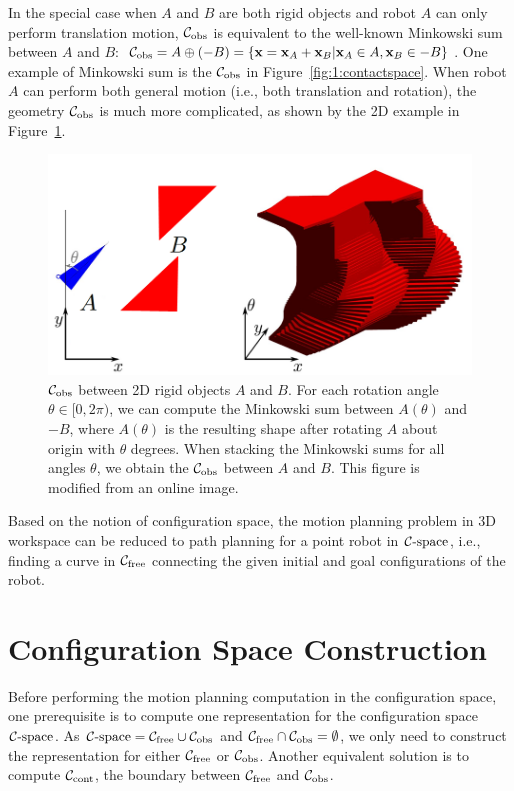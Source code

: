 In the special case when $A$ and $B$ are both rigid objects and robot $A$ can only perform translation motion, $\Cobs$ is equivalent to the well-known Minkowski sum between $A$ and $B$: $\mathcal C_{\text{obs}} = A \oplus (-B) = \{\mathbf x = \mathbf x_A + \mathbf x_B | \mathbf x_A \in A, \mathbf x_B \in -B \}$. One example of Minkowski sum is the $\Cobs$ in Figure~\ref{fig:1:contactspace}. When robot $A$ can perform both general motion (i.e., both translation and rotation), the geometry $\Cobs$ is much more complicated, as shown by the 2D example in Figure~\ref{fig:1:cspaceSE2}.

\begin{figure}[htb]
  \centering
  \includegraphics[width=0.9\linewidth]{figs/1/cspaceSE2.png}
  \caption[$\Cobs$ between 2D rigid objects $A$ and $B$]{$\Cobs$ between 2D rigid objects $A$ and $B$. For each rotation angle $\theta \in [0, 2\pi)$, we can compute the Minkowski sum between $A(\theta)$ and $-B$, where $A(\theta)$ is the resulting shape after rotating $A$ about origin with $\theta$ degrees. When stacking the Minkowski sums for all angles $\theta$, we obtain the $\Cobs$ between $A$ and $B$. This figure is modified from an online image.}
  \label{fig:1:cspaceSE2}
\end{figure}

Based on the notion of configuration space, the motion planning problem in 3D workspace can be reduced to path planning for a point robot in $\mathcal C\text{-space}$, i.e., finding a curve in $\mathcal C_{\text{free}}$ connecting the given initial and goal configurations of the robot.



\section{Configuration Space Construction}
\label{sec:1:configconstruction}
Before performing the motion planning computation in the configuration space, one prerequisite is to compute one representation for the configuration space $\mathcal C\text{-space}$. As $\mathcal C\text{-space} = \mathcal C_{\text{free}} \cup \mathcal C_{\text{obs}}$ and $\mathcal C_{\text{free}} \cap \mathcal C_{\text{obs}} = \emptyset$, we only need to construct the representation for either $\mathcal C_{\text{free}}$ or $\Cobs$. Another equivalent solution is to compute $\mathcal C_\text{cont}$, the boundary between $\mathcal C_{\text{free}}$ and $\Cobs$.

